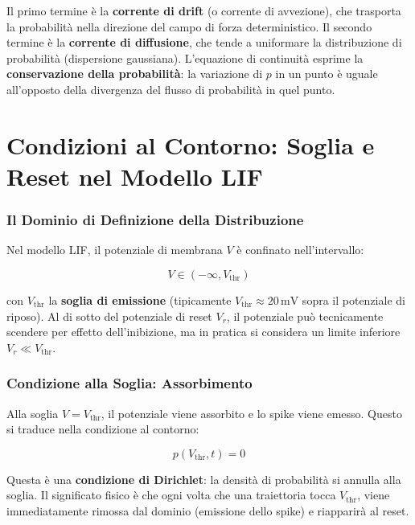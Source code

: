 Il primo termine è la \textbf{corrente di drift} (o corrente di avvezione), che trasporta la probabilità nella direzione del campo di forza deterministico. Il secondo termine è la \textbf{corrente di diffusione}, che tende a uniformare la distribuzione di probabilità (dispersione gaussiana). L'equazione di continuità esprime la \textbf{conservazione della probabilità}: la variazione di $p$ in un punto è uguale all'opposto della divergenza del flusso di probabilità in quel punto.



\section{Condizioni al Contorno: Soglia e Reset nel Modello LIF}

\subsubsection{Il Dominio di Definizione della Distribuzione}

Nel modello LIF, il potenziale di membrana $V$ è confinato nell'intervallo:

\begin{equation}
V \in (-\infty, V_{\text{thr}})
\end{equation}

con $V_{\text{thr}}$ la \textbf{soglia di emissione} (tipicamente $V_{\text{thr}} \approx 20\,\text{mV}$ sopra il potenziale di riposo). Al di sotto del potenziale di reset $V_r$, il potenziale può tecnicamente scendere per effetto dell'inibizione, ma in pratica si considera un limite inferiore $V_r \ll V_{\text{thr}}$.

\subsubsection{Condizione alla Soglia: Assorbimento}

Alla soglia $V = V_{\text{thr}}$, il potenziale viene assorbito e lo spike viene emesso. Questo si traduce nella condizione al contorno:

\begin{equation}
p(V_{\text{thr}}, t) = 0
\end{equation}

Questa è una \textbf{condizione di Dirichlet}: la densità di probabilità si annulla alla soglia. Il significato fisico è che ogni volta che una traiettoria tocca $V_{\text{thr}}$, viene immediatamente rimossa dal dominio (emissione dello spike) e riapparirà al reset.

